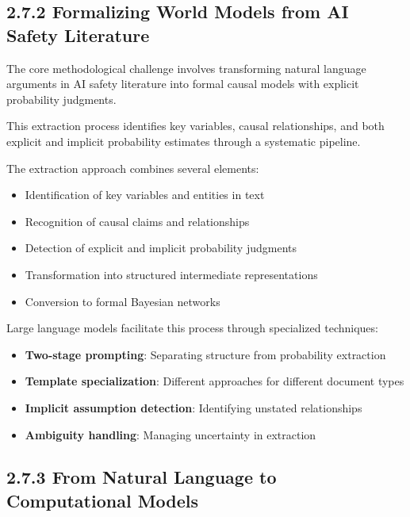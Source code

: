\documentclass[
  11pt,
  letterpaper,
]{book}
\providecommand{\tightlist}{%
  \setlength{\itemsep}{0pt}\setlength{\parskip}{0pt}}
\begin{document}
\subsection*{2.7.2 Formalizing World Models from AI Safety
Literature}\label{sec-formalizing-world-models}

The core methodological challenge involves transforming natural language
arguments in AI safety literature into formal causal models with
explicit probability judgments.

This extraction process identifies key variables, causal relationships,
and both explicit and implicit probability estimates through a
systematic pipeline.

The extraction approach combines several elements:

\begin{itemize}
\tightlist
\item
  Identification of key variables and entities in text
\item
  Recognition of causal claims and relationships
\item
  Detection of explicit and implicit probability judgments
\item
  Transformation into structured intermediate representations
\item
  Conversion to formal Bayesian networks
\end{itemize}

Large language models facilitate this process through specialized
techniques:

\begin{itemize}
\tightlist
\item
  \textbf{Two-stage prompting}: Separating structure from probability
  extraction
\item
  \textbf{Template specialization}: Different approaches for different
  document types
\item
  \textbf{Implicit assumption detection}: Identifying unstated
  relationships
\item
  \textbf{Ambiguity handling}: Managing uncertainty in extraction
\end{itemize}

\subsection*{2.7.3 From Natural Language to Computational
Models}\label{sec-natural-to-computational}
\end{document}
